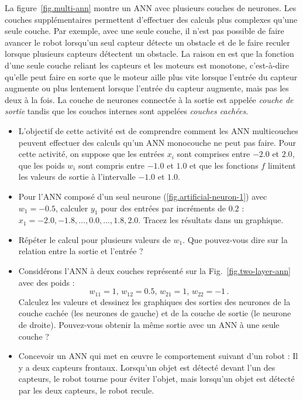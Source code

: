 La figure~\ref{fig.multi-ann} montre un ANN avec plusieurs couches de neurones. Les couches supplémentaires permettent d'effectuer des calculs plus complexes qu'une seule couche. Par exemple, avec une seule couche, il n'est pas possible de faire avancer le robot lorsqu'un seul capteur détecte un obstacle et de le faire reculer lorsque plusieurs capteurs détectent un obstacle. La raison en est que la fonction d'une seule couche reliant les capteurs et les moteurs est monotone, c'est-à-dire qu'elle peut faire en sorte que le moteur aille plus vite lorsque l'entrée du capteur augmente ou plus lentement lorsque l'entrée du capteur augmente, mais pas les deux à la fois. La couche de neurones connectée à la sortie est appelée \textit{couche de sortie} tandis que les couches internes sont appelées \emph{couches cachées}.

\begin{framed}
\begin{itemize}
\item L'objectif de cette activité est de comprendre comment les ANN multicouches peuvent effectuer des calculs qu'un ANN monocouche ne peut pas faire. Pour cette activité, on suppose que les entrées $x_i$ sont comprises entre $-2.0$ et $2.0$, que les poids $w_i$ sont compris entre $-1.0$ et $1.0$ et que les fonctions $f$ limitent les valeurs de sortie à l'intervalle $-1.0$ et $1.0$.
\item Pour l'ANN composé d'un seul neurone (\ref{fig.artificial-neuron-1}) avec $w_1=-0.5$, calculer $y_1$ pour des entrées par incréments de $0.2$ : $x_1=-2.0, -1.8, \ldots, 0.0, \ldots, 1.8, 2.0$. Tracez les résultats dans un graphique.
\item Répéter le calcul pour plusieurs valeurs de $w_1$. Que pouvez-vous dire sur la relation entre la sortie et l'entrée ?
\item Considérons l'ANN à deux couches représenté sur la Fig.~\ref{fig.two-layer-ann} avec des poids :
\[
 w_{11}=1,\, w_{12}=0.5,\, w_{21}=1,\, w_{22}=-1\,. 
\]
Calculez les valeurs et dessinez les graphiques des sorties des neurones de la couche cachée (les neurones de gauche) et de la couche de sortie (le neurone de droite). Pouvez-vous obtenir la même sortie avec un ANN à une seule couche ?
\end{itemize}
\end{framed}

\begin{framed}
\begin{itemize}
\item Concevoir un ANN qui met en œuvre le comportement suivant d'un robot : Il y a deux capteurs frontaux. Lorsqu'un objet est détecté devant l'un des capteurs, le robot tourne pour éviter l'objet, mais lorsqu'un objet est détecté par les deux capteurs, le robot recule.
\end{itemize}
\end{framed}


